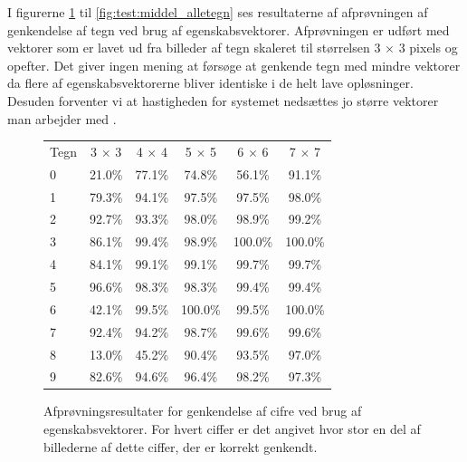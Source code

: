 
I figurerne \ref{fig:test:middel_tal} til \ref{fig:test:middel_alletegn} ses resultaterne af afprøvningen af genkendelse af tegn ved brug af egenskabsvektorer. Afprøvningen er udført med vektorer som er lavet ud fra billeder af tegn skaleret til størrelsen 3 $\times$ 3 pixels og opefter. Det giver ingen mening at førsøge at genkende tegn med mindre vektorer da flere af egenskabsvektorerne bliver identiske i de helt lave opløsninger. Desuden forventer vi at hastigheden for systemet nedsættes jo større vektorer man arbejder med
.

\begin{figure}[htp]
\centering
\begin{tabular}{|l|c|c|c|c|c|}\hline
\rowcolor[gray]{0.9} \multicolumn{6}{|>{\columncolor[gray]{0.9}}c|}{\textbf{Genkendelse af cifre - Egenskabsvektor}} \\ \hline
Tegn & 3 $\times$ 3 & 4 $\times$ 4 & 5 $\times$ 5 & 6 $\times$ 6 & 7 $\times$ 7\\\hline
0 & 21.0\% & 77.1\% & 74.8\% & 56.1\% & 91.1\%\\\hline
1 & 79.3\% & 94.1\% & 97.5\% & 97.5\% & 98.0\%\\\hline
2 & 92.7\% & 93.3\% & 98.0\% & 98.9\% & 99.2\%\\\hline
3 & 86.1\% & 99.4\% & 98.9\% & 100.0\% & 100.0\%\\\hline
4 & 84.1\% & 99.1\% & 99.1\% & 99.7\% & 99.7\%\\\hline
5 & 96.6\% & 98.3\% & 98.3\% & 99.4\% & 99.4\%\\\hline
6 & 42.1\% & 99.5\% & 100.0\% & 99.5\% & 100.0\%\\\hline
7 & 92.4\% & 94.2\% & 98.7\% & 99.6\% & 99.6\%\\\hline
8 & 13.0\% & 45.2\% & 90.4\% & 93.5\% & 97.0\%\\\hline
9 & 82.6\% & 94.6\% & 96.4\% & 98.2\% & 97.3\%\\\hline
\end{tabular}
\caption{Afprøvningsresultater for genkendelse af cifre ved brug af egenskabsvektorer. For hvert ciffer er det angivet hvor stor en del af billederne af dette ciffer, der er korrekt genkendt.}
\label{fig:test:middel_tal}
\end{figure}

